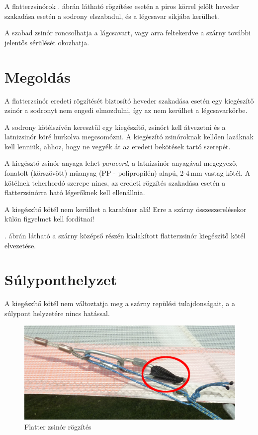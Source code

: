 \documentclass[a4paper,12pt]{report}
\begin{document}
A flatterzsinórok . ábrán látható rögzítése esetén a piros körrel jelölt heveder szakadása esetén a sodrony elszabadul, és a légcsavar síkjába kerülhet.

A szabad zsinór roncsolhatja a lágcsavart, vagy arra feltekerdve a szárny további jelentős sérülését okozhatja.

\section*{Megoldás}
A flatterzsinór eredeti rögzítését biztosító heveder szakadása esetén egy kiegészítő zsinór a sodronyt nem engedi elmozdulni, így az nem kerülhet a légcsavarkörbe.

A sodrony kötélszívén keresztül egy kiegészítő, zsinórt kell átvezetni és a latnizsinór köré hurkolva megcsomózni. A kiegészító zsinóroknak kellően lazáknak kell lenniük, ahhoz, hogy ne vegyék át az eredeti bekötések tartó szerepét.

A kiegésztő zsinór anyaga lehet \textit{paracord}, a latnizsinór anyagával megegyező, fonatolt (körszövött) műanyag (PP - polipropilén) alapú, 2-4\,mm vastag kötél.
A kötélnek teherhordó szerepe nincs, az eredeti rögzítés szakadása esetén a
flatterzsinórra ható légerőknek kell ellenállnia.

A kiegészítő kötél nem kerülhet a karabíner alá! Erre a szárny összeszerelésekor külön figyelmet kell fordítnai!

. ábrán látható a szárny középső részén kialakított flatterzsinór kiegészítő kötél elvezetése. 

\section*{Súlyponthelyzet}
A kiegészítő kötél nem változtatja meg a szárny repülési tulajdonságait, a a súlypont helyzetére nincs hatással.



\begin{figure}[ht!]
\centering
\includegraphics{kepek/1.jpg}
\caption{Flatter zsinór rögzítés}\label{flatter1}
\end{figure}
\end{document}
